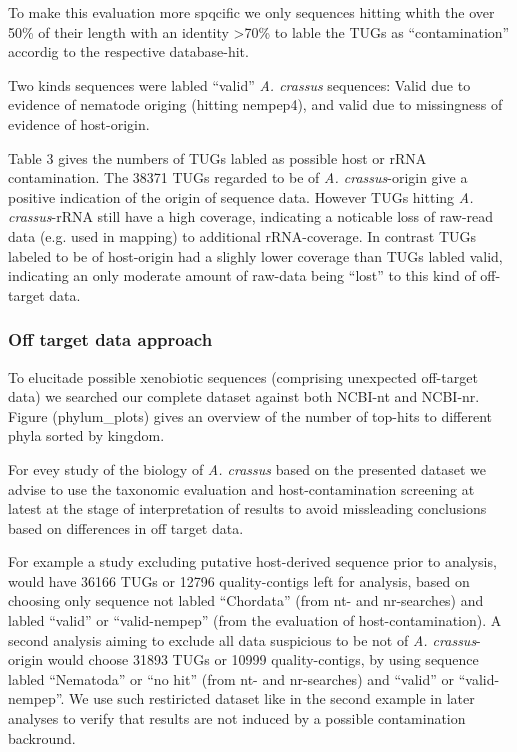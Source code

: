 \documentclass[10pt]{bmc_article}
\newenvironment{bmcformat}{\begin{raggedright}\baselineskip20pt\sloppy\setboolean{publ}{false}}{\end{raggedright}\baselineskip20pt\sloppy}
\begin{document}
\begin{bmcformat}
To make this evaluation more spqcific we only sequences hitting whith
the over 50\% of their length with an identity >70\% to lable the
TUGs as ``contamination'' accordig to the respective database-hit.

Two kinds sequences were labled ``valid'' \textit{A. crassus}
sequences: Valid due to evidence of nematode origing (hitting
nempep4), and valid due to missingness of evidence of host-origin.

Table 3 gives the numbers of TUGs labled as possible host or rRNA
contamination. The 38371 TUGs regarded to be of
\textit{A. crassus}-origin give a positive indication of the origin of
sequence data. However TUGs hitting \textit{A. crassus}-rRNA still
have a high coverage, indicating a noticable loss of raw-read data
(e.g. used in mapping) to additional rRNA-coverage. In contrast
TUGs labeled to be of host-origin had a slighly lower coverage than
TUGs labled valid, indicating an only moderate amount of raw-data
being ``lost'' to this kind of off-target data.

\subsubsection*{Off target data approach}

To elucitade possible xenobiotic sequences (comprising unexpected
off-target data) we searched our complete dataset against both NCBI-nt
and NCBI-nr. Figure (phylum\_plots) gives an overview of the number of
top-hits to different phyla sorted by kingdom.

For evey study of the biology of \textit{A. crassus} based on the
presented dataset we advise to use the taxonomic evaluation and
host-contamination screening at latest at the stage of interpretation
of results to avoid missleading conclusions based on differences in
off target data.

For example a study excluding putative host-derived sequence prior to
analysis, would have 36166 TUGs or 12796
quality-contigs left for analysis, based on choosing only sequence not
labled ``Chordata'' (from nt- and nr-searches) and labled ``valid'' or
``valid-nempep'' (from the evaluation of host-contamination). A second
analysis aiming to exclude all data suspicious to be not of
\textit{A. crassus}-origin would choose 31893 TUGs or
10999 quality-contigs, by using sequence labled
``Nematoda'' or ``no hit'' (from nt- and nr-searches) and ``valid'' or
``valid-nempep''. We use such restiricted dataset like in the second
example in later analyses to verify that results are not induced by a
possible contamination backround.


\end{bmcformat}
\end{document}
